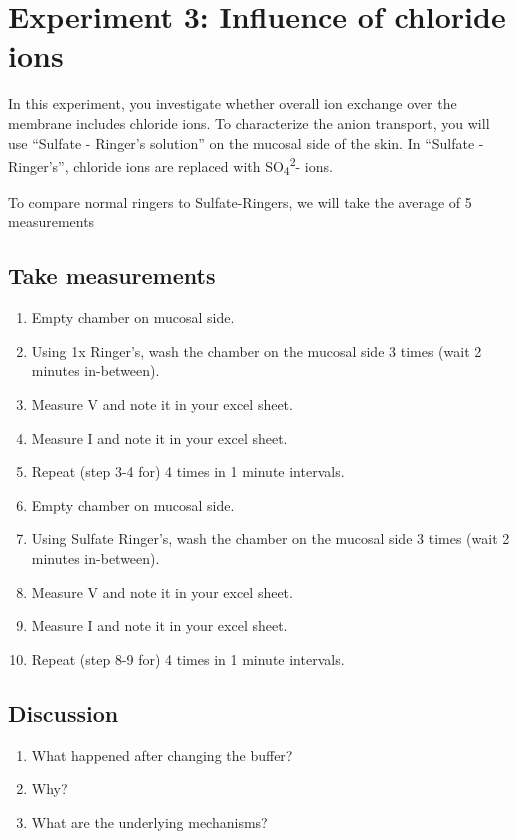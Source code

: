 \documentclass[
]{book}
\providecommand{\tightlist}{%
  \setlength{\itemsep}{0pt}\setlength{\parskip}{0pt}}
\begin{document}
\chapter{Experiment 3: Influence of chloride ions}\label{experiment-3-influence-of-chloride-ions}

In this experiment, you investigate whether overall ion exchange over the membrane includes chloride ions. To characterize the anion transport, you will use ``Sulfate - Ringer's solution'' on the mucosal side of the skin. In ``Sulfate - Ringer's'', chloride ions are replaced with SO\textsubscript{4}\textsuperscript{2}- ions.

To compare normal ringers to Sulfate-Ringers, we will take the average of 5 measurements

\section{Take measurements}\label{take-measurements-2}

\begin{enumerate}
\def\labelenumi{\arabic{enumi}.}
\item
  Empty chamber on mucosal side.
\item
  Using 1x Ringer's, wash the chamber on the mucosal side 3 times (wait 2 minutes in-between).
\item
  Measure V and note it in your excel sheet.
\item
  Measure I and note it in your excel sheet.
\item
  Repeat (step 3-4 for) 4 times in 1 minute intervals.
\item
  Empty chamber on mucosal side.
\item
  Using Sulfate Ringer's, wash the chamber on the mucosal side 3 times (wait 2 minutes in-between).
\item
  Measure V and note it in your excel sheet.
\item
  Measure I and note it in your excel sheet.
\item
  Repeat (step 8-9 for) 4 times in 1 minute intervals.
\end{enumerate}

\section{Discussion}\label{discussion-2}

\begin{enumerate}
\def\labelenumi{\arabic{enumi}.}
\tightlist
\item
  What happened after changing the buffer?
\item
  Why?
\item
  What are the underlying mechanisms?
\end{enumerate}
\end{document}

